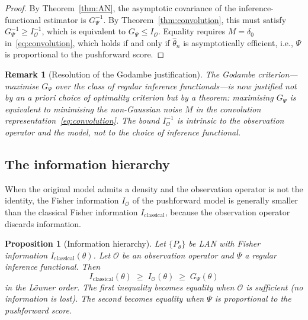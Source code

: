 \documentclass[11pt,a4paper]{article}
\newtheorem{proposition}[theorem]{Proposition}
\newtheorem{remark}[theorem]{Remark}
\newcommand{\ie}{{i.e.}, }
\begin{document}
\begin{proof}
By Theorem~\ref{thm:AN}, the asymptotic covariance of the inference-functional estimator is $G_\Psi^{-1}$.  By Theorem~\ref{thm:convolution}, this must satisfy $G_\Psi^{-1} \geq I_{\mathcal O}^{-1}$, which is equivalent to $G_\Psi \leq I_{\mathcal O}$.  Equality requires $M = \delta_0$ in~\eqref{eq:convolution}, which holds if and only if $\hat\theta_n$ is asymptotically efficient, \ie $\Psi$ is proportional to the pushforward score.
\end{proof}

\begin{remark}[Resolution of the Godambe justification]\label{rem:godambe-justified}
The Godambe criterion---maximise $G_\Psi$ over the class of regular
inference functionals---is now justified not by an \emph{a priori} choice of
optimality criterion but by a \emph{theorem}: maximising $G_\Psi$ is
equivalent to minimising the non-Gaussian noise $M$ in the convolution
representation~\eqref{eq:convolution}.  The bound $I_{\mathcal O}^{-1}$ is
intrinsic to the observation operator and the model, not to the choice of
inference functional.
\end{remark}

\subsection{The information hierarchy}\label{subsec:hierarchy}

When the original model admits a density and the observation operator is not
the identity, the Fisher information $I_{\mathcal O}$ of the pushforward
model is generally smaller than the classical Fisher information
$I_{\mathrm{classical}}$, because the observation operator discards
information.

\begin{proposition}[Information hierarchy]\label{prop:hierarchy}
Let $\{P_\theta\}$ be LAN with Fisher information
$I_{\mathrm{classical}}(\theta)$.  Let $\mathcal O$ be an observation
operator and $\Psi$ a regular inference functional.  Then
\begin{equation}\label{eq:hierarchy}
I_{\mathrm{classical}}(\theta)
\;\geq\;
I_{\mathcal O}(\theta)
\;\geq\;
G_\Psi(\theta)
\end{equation}
in the L\"owner order.  The first inequality becomes equality when
$\mathcal O$ is sufficient (no information is lost).  The second becomes
equality when $\Psi$ is proportional to the pushforward score.
\end{proposition}
\end{document}
